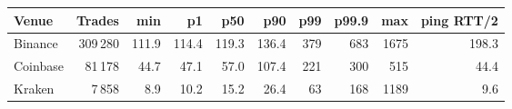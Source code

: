 \begin{tabular}{lrrrrrrrrr}
\toprule
Venue & Trades & min & p1 & p50 & p90 & p99 & p99.9 & max & ping RTT/2 \\
\midrule
Binance & 309\,280 & 111.9 & 114.4 & 119.3 & 136.4 & 379 & 683 & 1675 & 198.3 \\
Coinbase & 81\,178 & 44.7 & 47.1 & 57.0 & 107.4 & 221 & 300 & 515 & 44.4 \\
Kraken & 7\,858 & 8.9 & 10.2 & 15.2 & 26.4 & 63 & 168 & 1189 & 9.6 \\
\bottomrule
\end{tabular}
